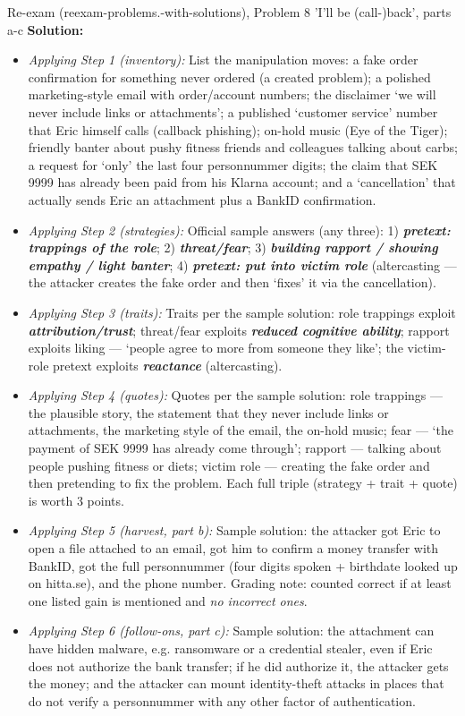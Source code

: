 \documentclass[12pt, a4paper]{article}
\newcommand{\term}[1]{\textbf{\textit{#1}}}        %
\begin{document}
\begin{practicebox}{Re-exam (reexam-problems.-with-solutions), Problem 8 'I'll be (call-)back', parts a-c}
\textbf{Solution:}
\begin{itemize}
    \item \textit{Applying Step 1 (inventory):} List the manipulation moves: a fake order confirmation for something never ordered (a created problem); a polished marketing-style email with order/account numbers; the disclaimer `we will never include links or attachments'; a published `customer service' number that Eric himself calls (callback phishing); on-hold music (Eye of the Tiger); friendly banter about pushy fitness friends and colleagues talking about carbs; a request for `only' the last four personnummer digits; the claim that SEK 9999 has already been paid from his Klarna account; and a `cancellation' that actually sends Eric an attachment plus a BankID confirmation.
    \item \textit{Applying Step 2 (strategies):} Official sample answers (any three): 1) \term{pretext: trappings of the role}; 2) \term{threat/fear}; 3) \term{building rapport / showing empathy / light banter}; 4) \term{pretext: put into victim role} (altercasting --- the attacker creates the fake order and then `fixes' it via the cancellation).
    \item \textit{Applying Step 3 (traits):} Traits per the sample solution: role trappings exploit \term{attribution/trust}; threat/fear exploits \term{reduced cognitive ability}; rapport exploits liking --- `people agree to more from someone they like'; the victim-role pretext exploits \term{reactance} (altercasting).
    \item \textit{Applying Step 4 (quotes):} Quotes per the sample solution: role trappings --- the plausible story, the statement that they never include links or attachments, the marketing style of the email, the on-hold music; fear --- `the payment of SEK 9999 has already come through'; rapport --- talking about people pushing fitness or diets; victim role --- creating the fake order and then pretending to fix the problem. Each full triple (strategy + trait + quote) is worth 3 points.
    \item \textit{Applying Step 5 (harvest, part b):} Sample solution: the attacker got Eric to open a file attached to an email, got him to confirm a money transfer with BankID, got the full personnummer (four digits spoken + birthdate looked up on hitta.se), and the phone number. Grading note: counted correct if at least one listed gain is mentioned and \emph{no incorrect ones}.
    \item \textit{Applying Step 6 (follow-ons, part c):} Sample solution: the attachment can have hidden malware, e.g. ransomware or a credential stealer, even if Eric does not authorize the bank transfer; if he did authorize it, the attacker gets the money; and the attacker can mount identity-theft attacks in places that do not verify a personnummer with any other factor of authentication.

\end{itemize}
\end{practicebox}
\end{document}
